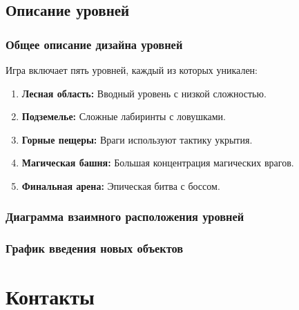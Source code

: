 \documentclass{article}
\begin{document}
\subsection{Описание уровней}
\subsubsection{Общее описание дизайна уровней}
Игра включает пять уровней, каждый из которых уникален:
\begin{enumerate}
    \item \textbf{Лесная область:} Вводный уровень с низкой сложностью.
    \item \textbf{Подземелье:} Сложные лабиринты с ловушками.
    \item \textbf{Горные пещеры:} Враги используют тактику укрытия.
    \item \textbf{Магическая башня:} Большая концентрация магических врагов.
    \item \textbf{Финальная арена:} Эпическая битва с боссом.
\end{enumerate}
\subsubsection{Диаграмма взаимного расположения уровней}
\subsubsection{График введения новых объектов}

\section{Контакты}

\newpage
\end{document}
